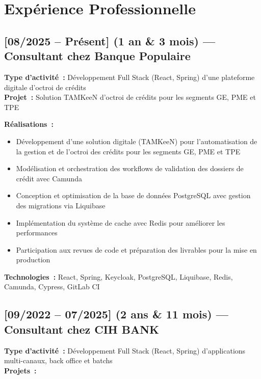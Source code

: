 \section*{Expérience Professionnelle}

\subsection*{[08/2025 -- Présent] (1 an \& 3 mois) --- Consultant chez Banque Populaire}
\vspace{4pt}
\textbf{Type d'activité~:} Développement Full Stack (React, Spring) d'une plateforme digitale d'octroi de crédits\\
\textbf{Projet~:} Solution TAMKeeN d'octroi de crédits pour les segments GE, PME et TPE

\textbf{Réalisations~:}
\begin{itemize}
    \item Développement d'une solution digitale (TAMKeeN) pour l'automatisation de la gestion et de l'octroi des crédits pour les segments GE, PME et TPE
    \item Modélisation et orchestration des workflows de validation des dossiers de crédit avec Camunda
    \item Conception et optimisation de la base de données PostgreSQL avec gestion des migrations via Liquibase
    \item Implémentation du système de cache avec Redis pour améliorer les performances
    \item Participation aux revues de code et préparation des livrables pour la mise en production
\end{itemize}
\textbf{Technologies~:} React, Spring, Keycloak, PostgreSQL, Liquibase, Redis, Camunda, Cypress, GitLab CI

\subsection*{[09/2022 -- 07/2025] (2 ans \& 11 mois) --- Consultant chez CIH BANK}
\textbf{Type d'activité~:} Développement Full Stack (React, Spring) d'applications multi-canaux, back office et batchs\\
\textbf{Projets~:}

